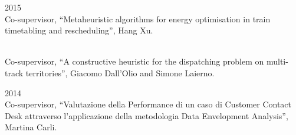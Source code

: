 \begin{paracol}{2}
  2015
\switchcolumn
  \\
  Co-supervisor, ``Metaheuristic algorithms for energy optimisation in train timetabling and rescheduling'', Hang Xu.

  \\
  Co-supervisor, ``A constructive heuristic for the dispatching problem on multi-track territories'', Giacomo Dall'Olio and Simone Laierno.
\end{paracol}

\begin{paracol}{2}
  2014
\switchcolumn
  \\
  Co-supervisor, ``Valutazione della Performance di un caso di Customer Contact Desk attraverso l'applicazione della metodologia Data Envelopment Analysis'', Martina Carli.
\end{paracol}

